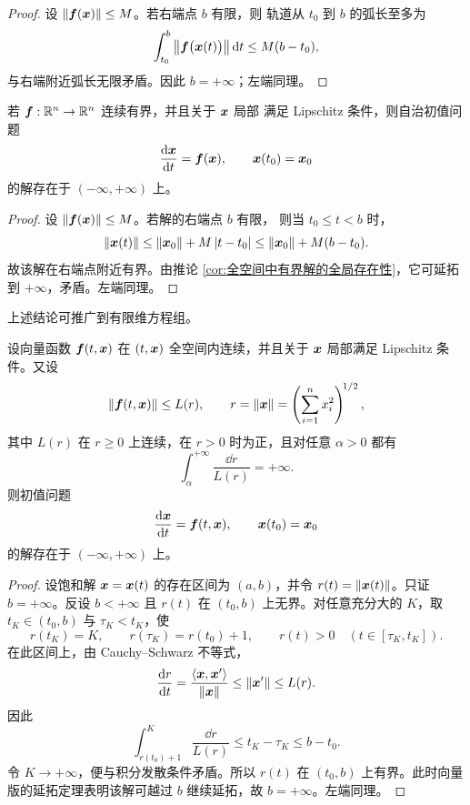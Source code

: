 \begin{proof}
	设 $\left\| \boldsymbol{f}(\boldsymbol{x}) \right\|\leq M$。若右端点 $b$ 有限，则
	轨道从 $t_0$ 到 $b$ 的弧长至多为
	\[
		\int_{t_0}^{b}
		\left\| \boldsymbol{f}\bigl(\boldsymbol{x}(t)\bigr) \right\|\mathrm{d} t
		\leq M(b-t_0),
	\]
	与右端附近弧长无限矛盾。因此 $b=+\infty$；左端同理。
\end{proof}

\begin{corollary}[全空间中有界向量场的全局存在性]
	\label{cor:全空间中有界向量场的全局存在性}
	若 $\boldsymbol{f}:\mathbb{R}^n\to\mathbb{R}^n$ 连续有界，并且关于 $\boldsymbol{x}$ 局部
	满足 Lipschitz 条件，则自治初值问题
	\[
		\dfrac{\mathrm{d}\boldsymbol{x}}{\mathrm{d} t}=\boldsymbol{f}(\boldsymbol{x}),
		\qquad
		\boldsymbol{x}(t_0)=\boldsymbol{x}_0
	\]
	的解存在于 $(-\infty,+\infty)$ 上。
\end{corollary}

\begin{proof}
	设 $\left\| \boldsymbol{f}(\boldsymbol{x}) \right\|\leq M$。若解的右端点 $b$ 有限，
	则当 $t_0\leq t<b$ 时，
	\[
		\left\| \boldsymbol{x}(t) \right\|
		\leq\left\| \boldsymbol{x}_0 \right\|+M\left| t-t_0 \right|
		\leq\left\| \boldsymbol{x}_0 \right\|+M(b-t_0).
	\]
	故该解在右端点附近有界。由推论
	\ref{cor:全空间中有界解的全局存在性}，它可延拓到
	$+\infty$，矛盾。左端同理。
\end{proof}

上述结论可推广到有限维方程组。

\begin{theorem}[Wintner 定理]\label{cor:Wintner延拓定理}
	设向量函数 $\boldsymbol{f}(t,\boldsymbol{x})$ 在
	$(t,\boldsymbol{x})$ 全空间内连续，并且关于 $\boldsymbol{x}$ 局部满足
	Lipschitz 条件。又设
	\[
		\left\| \boldsymbol{f}(t,\boldsymbol{x}) \right\|\leq L(r),
		\qquad
		r=\left\| \boldsymbol{x} \right\|
		=\left(\sum_{i=1}^{n}x_i^2\right)^{\!1/2},
	\]
	其中 $L(r)$ 在 $r\geq0$ 上连续，在 $r>0$ 时为正，且对任意
	$\alpha>0$ 都有
	\[
		\int_{\alpha}^{+\infty}\dfrac{\dd r}{L(r)}=+\infty.
	\]
	则初值问题
	\[
		\dfrac{\mathrm{d}\boldsymbol{x}}{\mathrm{d} t}=\boldsymbol{f}(t,\boldsymbol{x}),
		\qquad
		\boldsymbol{x}(t_0)=\boldsymbol{x}_0
	\]
	的解存在于 $(-\infty,+\infty)$ 上。
\end{theorem}

\begin{proof}
	设饱和解 $\boldsymbol{x}=\boldsymbol{x}(t)$ 的存在区间为 $(a,b)$，并令
	$r(t)=\left\| \boldsymbol{x}(t) \right\|$。只证 $b=+\infty$。反设 $b<+\infty$ 且
	$r(t)$ 在 $(t_0,b)$ 上无界。对任意充分大的 $K$，取
	$t_K\in(t_0,b)$ 与 $\tau_K<t_K$，使
	\[
		r(t_K)=K,
		\qquad
		r(\tau_K)=r(t_0)+1,
		\qquad
		r(t)>0\quad(t\in[\tau_K,t_K]).
	\]
	在此区间上，由 Cauchy--Schwarz 不等式，
	\[
		\dfrac{\mathrm{d} r}{\mathrm{d} t}
		=\dfrac{\left\langle\boldsymbol{x},\boldsymbol{x}'\right\rangle}
		{\left\| \boldsymbol{x} \right\|}
		\leq\left\| \boldsymbol{x}' \right\|
		\leq L(r).
	\]
	因此
	\[
		\int_{r(t_0)+1}^{K}\dfrac{\dd r}{L(r)}
		\leq t_K-\tau_K
		\leq b-t_0.
	\]
	令 $K\to+\infty$，便与积分发散条件矛盾。所以 $r(t)$ 在
	$(t_0,b)$ 上有界。此时向量版的延拓定理表明该解可越过 $b$
	继续延拓，故 $b=+\infty$。左端同理。
\end{proof}

